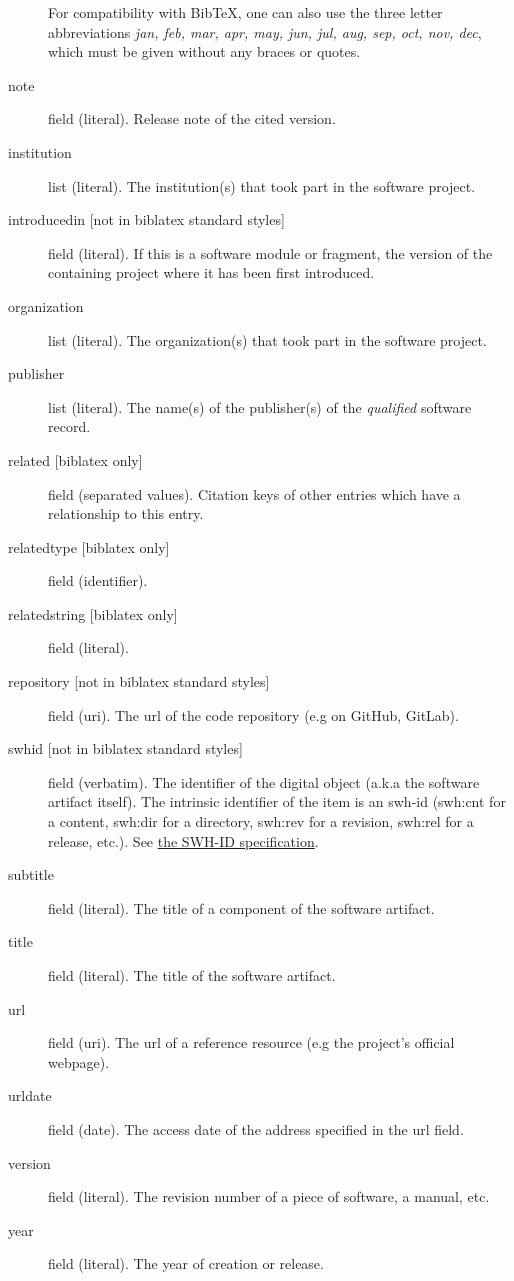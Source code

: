 \begin{description}
For compatibility with BibTeX, one can also use the three letter
abbreviations \emph{jan, feb, mar, apr, may, jun, jul, aug, sep, oct, nov, dec},
which must be given without any braces or quotes.
\item[{note}] field (literal). Release note of the cited version.
\item[{institution}] list (literal). The institution(s) that took part in the software project.
\item[{introducedin [not in biblatex standard styles]}] field (literal). If this is a software module or fragment,
the version of the containing project where it has been first introduced.
\item[{organization}] list (literal). The organization(s) that took part in the software project.
\item[{publisher}] list (literal). The name(s) of the publisher(s) of the \emph{qualified} software record.
\item[{related [biblatex only]}] field (separated values). Citation keys of other entries which have a relationship to this entry.
\item[{relatedtype [biblatex only]}] field (identifier).
\item[{relatedstring [biblatex only]}] field (literal).
\item[{repository [not in biblatex standard styles]}] field (uri). The url of the code repository (e.g on GitHub, GitLab).
\item[{swhid [not in biblatex standard styles]}] field (verbatim). The identifier of the digital
object (a.k.a the software artifact itself). The intrinsic identifier
of the item is an swh-id (swh:cnt for a content, swh:dir for a directory, swh:rev for
a revision, swh:rel for a release, etc.). See \href{https://docs.softwareheritage.org/devel/swh-model/persistent-identifiers.html}{the SWH-ID specification}.
\item[{subtitle}] field (literal). The title of a component of the software artifact.
\item[{title}] field (literal). The title of the software artifact.
\item[{url}] field (uri). The url of a reference resource (e.g the project's official webpage).
\item[{urldate}] field (date). The access date of the address specified in the url field.
\item[{version}] field (literal). The revision number of a piece of software, a manual, etc.
\item[{year}] field (literal). The year of creation or release.
\end{description}
